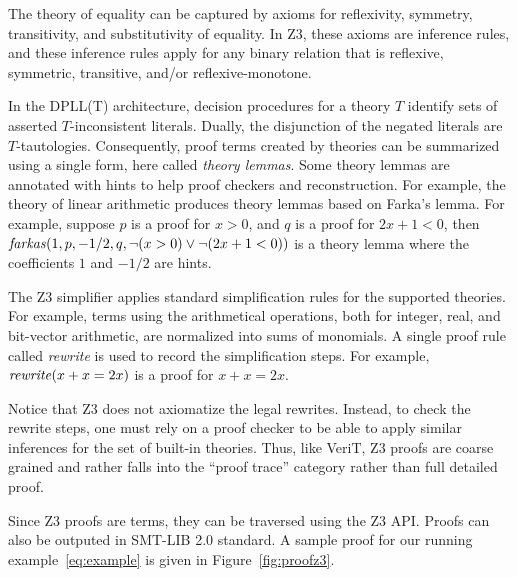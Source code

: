 \documentclass{llncs}
\begin{document}
The theory of equality can be captured by axioms for reflexivity,
symmetry, transitivity, and substitutivity of equality. In Z3,
these axioms are inference rules, and these inference rules apply
for any binary relation that is reflexive,
symmetric, transitive, and/or reflexive-monotone.

In the DPLL(T) architecture, decision procedures for a theory $T$
identify sets of asserted $T$-inconsistent literals. Dually, the
disjunction of the negated literals are $T$-tautologies. Consequently,
proof terms created by theories can be summarized using a single form,
here called \emph{theory lemmas}. Some theory lemmas are annotated
with hints to help proof checkers and reconstruction. For example, the
theory of linear arithmetic produces theory lemmas based on Farka's
lemma. For example, suppose $p$ is a proof for $x > 0$, and $q$ is a
proof for $2x + 1 < 0$, then $\mbox{\emph{farkas}}(1, p, -1/2, q, \neg(x > 0) \vee \neg(2x + 1 < 0))$
is a theory lemma where the coefficients $1$ and $-1/2$ are hints.



The Z3 simplifier applies standard simplification rules for the
supported theories. For example, terms using the arithmetical operations,
both for integer, real, and bit-vector arithmetic, are normalized into sums of monomials.
A single proof rule called \emph{rewrite} is used to record the simplification steps.
For example, $\mbox{\emph{rewrite}}(x + x = 2 x)$ is a proof for $x + x = 2x$.

Notice that Z3 does not axiomatize the legal rewrites.
Instead, to check the rewrite steps, one must rely on a
proof checker to be able to apply similar inferences for the set of built-in theories.
Thus, like VeriT, Z3 proofs are coarse grained and rather falls into the “proof trace”
category rather than full detailed proof.

Since Z3 proofs are terms, they can be traversed using the Z3 API.
Proofs can also be outputed in SMT-LIB 2.0 standard. A sample proof
for our running example~\ref{eq:example} is given in
Figure~\ref{fig:proofz3}.
\end{document}
